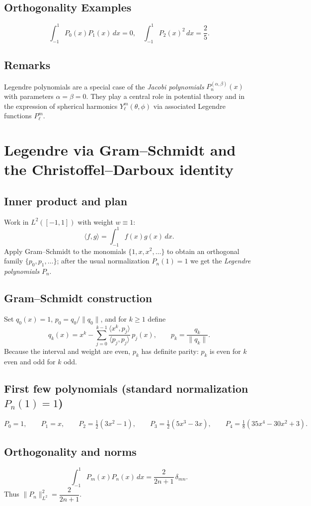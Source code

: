 \documentclass[12pt,a4paper]{article}
\theoremstyle{plain}
\theoremstyle{definition}
\theoremstyle{remark}
\theoremstyle{remark}
\begin{document}
\subsection*{Orthogonality Examples}
\[
\int_{-1}^{1}P_0(x)P_1(x)\,dx=0,\quad
\int_{-1}^{1}P_2(x)^2\,dx=\frac{2}{5}.
\]

\subsection*{Remarks}
Legendre polynomials are a special case of the \emph{Jacobi polynomials}
$P_n^{(\alpha,\beta)}(x)$ with parameters $\alpha=\beta=0$.
They play a central role in potential theory and in the expression of spherical harmonics
$Y_\ell^m(\theta,\phi)$ via associated Legendre functions $P_\ell^m$.

\section*{Legendre via Gram--Schmidt and the Christoffel--Darboux identity}

\subsection*{Inner product and plan}
Work in $L^2([-1,1])$ with weight $w\equiv1$:
\[
\langle f,g\rangle=\int_{-1}^{1} f(x)g(x)\,dx.
\]
Apply Gram--Schmidt to the monomials $\{1,x,x^2,\dots\}$ to obtain an orthogonal family
$\{p_0,p_1,\dots\}$; after the usual normalization $P_n(1)=1$ we get the \emph{Legendre polynomials} $P_n$.

\subsection*{Gram--Schmidt construction}
Set $q_0(x)=1$, $p_0=q_0/\|q_0\|$, and for $k\ge1$ define
\[
q_k(x)=x^k-\sum_{j=0}^{k-1}\frac{\langle x^k,p_j\rangle}{\langle p_j,p_j\rangle}\,p_j(x),
\qquad
p_k=\frac{q_k}{\|q_k\|}.
\]
Because the interval and weight are even, $p_k$ has definite parity:
$p_k$ is even for $k$ even and odd for $k$ odd.

\subsection*{First few polynomials (standard normalization $P_n(1)=1$)}
\[
P_0=1,\qquad
P_1=x,\qquad
P_2=\tfrac12(3x^2-1),\qquad
P_3=\tfrac12(5x^3-3x),\qquad
P_4=\tfrac18(35x^4-30x^2+3).
\]

\subsection*{Orthogonality and norms}
\[
\int_{-1}^{1} P_m(x)P_n(x)\,dx=\frac{2}{2n+1}\,\delta_{mn}.
\]
Thus $\|P_n\|_{L^2}^2=\dfrac{2}{2n+1}$.
\end{document}
